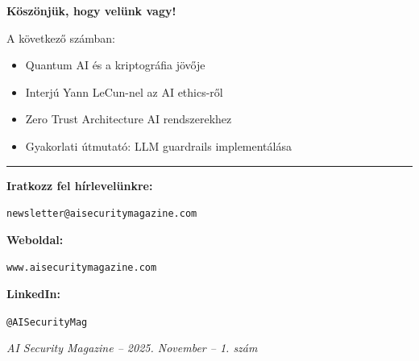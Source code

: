 \documentclass{../templates/magazine}
\begin{document}
\begin{center}

{\Huge\color{primary}\textbf{Köszönjük, hogy velünk vagy!}}

\vspace{2cm}

{\Large\color{darkgray}A következő számban:}

\vspace{1cm}

\begin{itemize}[leftmargin=2cm, itemsep=0.5cm]
    \item {\large Quantum AI és a kriptográfia jövője}
    \item {\large Interjú Yann LeCun-nel az AI ethics-ről}
    \item {\large Zero Trust Architecture AI rendszerekhez}
    \item {\large Gyakorlati útmutató: LLM guardrails implementálása}
\end{itemize}

\vspace{2cm}

{\color{darkgray}\rule{0.5\textwidth}{1pt}}

\vspace{1cm}

\textbf{Iratkozz fel hírlevelünkre:}

\texttt{newsletter@aisecuritymagazine.com}

\vspace{0.5cm}

\textbf{Weboldal:}

\texttt{www.aisecuritymagazine.com}

\vspace{0.5cm}

\textbf{LinkedIn:}

\texttt{@AISecurityMag}

\vspace{3cm}

{\footnotesize\color{darkgray}\textit{AI Security Magazine -- 2025. November -- 1. szám}}

\end{center}
\end{document}
